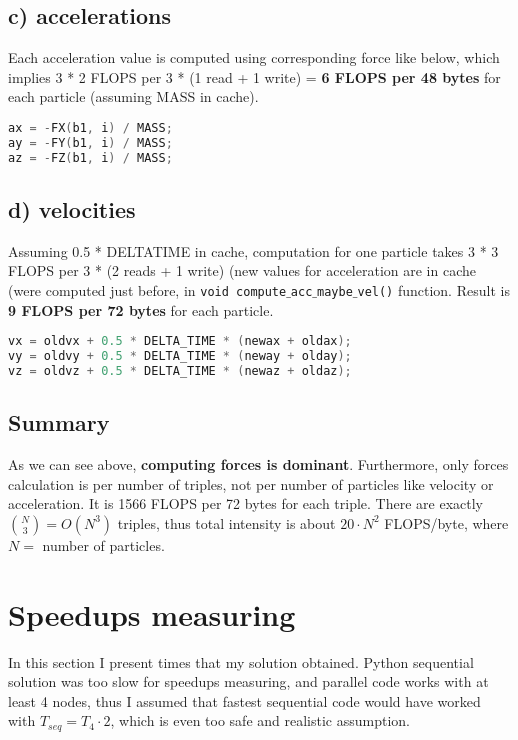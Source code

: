 \documentclass[12pt]{article}
\newcommand{\code}[1]{\texttt{#1}}
\begin{document}
\subsection*{c) accelerations}

Each acceleration value is computed using corresponding force like below, which implies 3 * 2 FLOPS per 3 * (1 read + 1 write) =  \textbf{6 FLOPS per 48 bytes} for each particle (assuming MASS in cache).
\begin{lstlisting}[language=C]
ax = -FX(b1, i) / MASS;
ay = -FY(b1, i) / MASS;
az = -FZ(b1, i) / MASS;
\end{lstlisting}

\subsection*{d) velocities}

Assuming 0.5 * DELTATIME in cache, computation for one particle takes 3 * 3 FLOPS per 3 * (2 reads + 1 write) (new values for acceleration are in cache (were computed just before, in \code{void compute$\_$acc$\_$maybe$\_$vel()} function. Result is \textbf{9 FLOPS per 72 bytes} for each particle.

\begin{lstlisting}[language=C]
vx = oldvx + 0.5 * DELTA_TIME * (newax + oldax);
vy = oldvy + 0.5 * DELTA_TIME * (neway + olday);
vz = oldvz + 0.5 * DELTA_TIME * (newaz + oldaz);
\end{lstlisting}

\subsection*{Summary}
As we can see above, \textbf{computing forces is dominant}. Furthermore, only forces calculation is per number of triples, not per number of particles like velocity or acceleration. It is 1566 FLOPS per 72 bytes for each triple. There are exactly $\binom{N}{3} = O(N^3)$ triples, thus total intensity is about $20\cdot N^2$ FLOPS/byte, where $N =$ number of particles.


\section*{\fontsize{18}{18}\selectfont Speedups measuring}

In this section I present times that my solution obtained. Python sequential solution was too slow for speedups measuring, and parallel code works with at least 4 nodes, thus I assumed that fastest sequential code would have worked with $T_{seq} = T_4 \cdot 2$, which is even too safe and realistic assumption.
\end{document}
